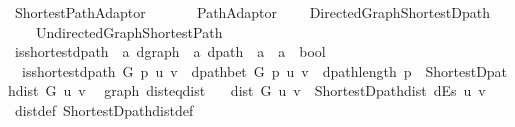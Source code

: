 %
\begin{isabellebody}%
%
%
\isadelimtheory
%
\endisadelimtheory
%
\isatagtheory
{}\isamarkupfalse%
\ Shortest{\isacharunderscore}{\kern0pt}Path{\isacharunderscore}{\kern0pt}Adaptor\isanewline
\ \ \isanewline
\ \ \ \ Path{\isacharunderscore}{\kern0pt}Adaptor\isanewline
\ \ \ \ {\isachardoublequoteopen}{\isachardot}{\kern0pt}{\isachardot}{\kern0pt}{\isacharslash}{\kern0pt}Directed{\isacharunderscore}{\kern0pt}Graph{\isacharslash}{\kern0pt}Shortest{\isacharunderscore}{\kern0pt}Dpath{\isachardoublequoteclose}\isanewline
\ \ \ \ {\isachardoublequoteopen}{\isachardot}{\kern0pt}{\isachardot}{\kern0pt}{\isacharslash}{\kern0pt}Undirected{\isacharunderscore}{\kern0pt}Graph{\isacharslash}{\kern0pt}Shortest{\isacharunderscore}{\kern0pt}Path{\isachardoublequoteclose}\isanewline
{}%
\endisatagtheory
{\isafoldtheory}%
%
\isadelimtheory
\isanewline
%
\endisadelimtheory
\isanewline
{}\isamarkupfalse%
\ is{\isacharunderscore}{\kern0pt}shortest{\isacharunderscore}{\kern0pt}dpath\ {\isacharcolon}{\kern0pt}{\isacharcolon}{\kern0pt}\ {\isachardoublequoteopen}{\isacharprime}{\kern0pt}a\ dgraph\ {\isasymRightarrow}\ {\isacharprime}{\kern0pt}a\ dpath\ {\isasymRightarrow}\ {\isacharprime}{\kern0pt}a\ {\isasymRightarrow}\ {\isacharprime}{\kern0pt}a\ {\isasymRightarrow}\ bool{\isachardoublequoteclose}\ \isanewline
\ \ {\isachardoublequoteopen}is{\isacharunderscore}{\kern0pt}shortest{\isacharunderscore}{\kern0pt}dpath\ G\ p\ u\ v\ {\isasymequiv}\ dpath{\isacharunderscore}{\kern0pt}bet\ G\ p\ u\ v\ {\isasymand}\ dpath{\isacharunderscore}{\kern0pt}length\ p\ {\isacharequal}{\kern0pt}\ Shortest{\isacharunderscore}{\kern0pt}Dpath{\isachardot}{\kern0pt}dist\ G\ u\ v{\isachardoublequoteclose}\isanewline
\isanewline
{}\isamarkupfalse%
\ {\isacharparenleft}{\kern0pt}\ graph{\isacharparenright}{\kern0pt}\ dist{\isacharunderscore}{\kern0pt}eq{\isacharunderscore}{\kern0pt}dist{\isacharcolon}{\kern0pt}\isanewline
\ \ \ {\isachardoublequoteopen}dist\ G\ u\ v\ {\isacharequal}{\kern0pt}\ Shortest{\isacharunderscore}{\kern0pt}Dpath{\isachardot}{\kern0pt}dist\ dEs\ u\ v{\isachardoublequoteclose}\isanewline
%
\isadelimproof
\ \ %
\endisadelimproof
%
\isatagproof
{}\isamarkupfalse%
\ dist{\isacharunderscore}{\kern0pt}def\ Shortest{\isacharunderscore}{\kern0pt}Dpath{\isachardot}{\kern0pt}dist{\isacharunderscore}{\kern0pt}def\isanewline

\end{isabellebody}
